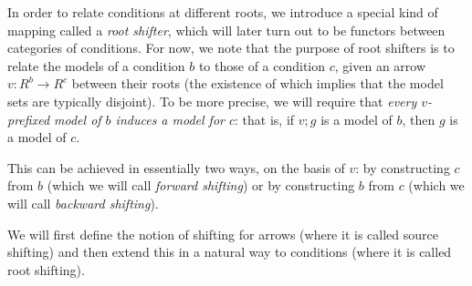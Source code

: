 In order to relate conditions at different roots, we introduce a special kind of mapping called a \emph{root shifter}, which will later turn out to be functors between categories of conditions. For now, we note that the purpose of root shifters is to relate the models of a condition $b$ to those of a condition $c$, given an arrow $v:R^b\to R^c$ between their roots (the existence of which implies that the model sets are typically disjoint). To be more precise, we will require that \emph{every $v$-prefixed model of $b$ induces a model for $c$}: that is, if $v;g$ is a model of $b$, then $g$ is a model of $c$.

This can be achieved in essentially two ways, on the basis of $v$: by constructing $c$ from $b$ (which we will call \emph{forward shifting}) or by constructing $b$ from $c$ (which we will call \emph{backward shifting}).

We will first define the notion of shifting for arrows (where it is called source shifting) and then extend this in a natural way to conditions (where it is called root shifting).

